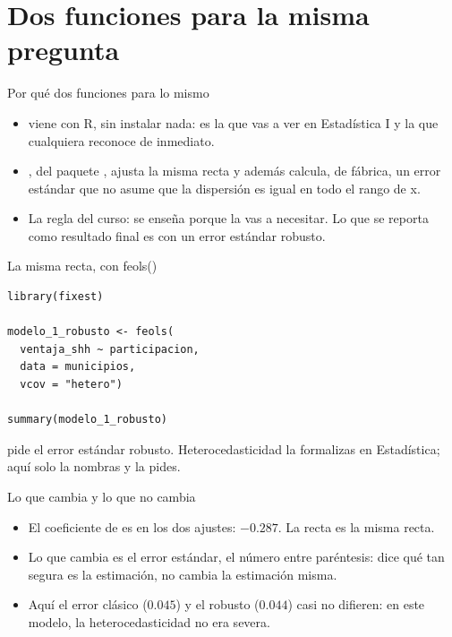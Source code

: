 \section{Dos funciones para la misma pregunta}

\begin{frame}{Por qué dos funciones para lo mismo}
  \vspace{0.3em}
  \begin{itemize}\setlength{\itemsep}{0.9em}
    \item<1->  viene con R, sin instalar nada: es la que vas a ver
          en Estadística I y la que cualquiera reconoce de inmediato.
    \item<2-> , del paquete , ajusta la misma
          recta y además calcula, de fábrica, un error estándar que no
          asume que la dispersión es igual en todo el rango de x.
    \item<3-> La regla del curso:  se enseña porque la vas a
          necesitar. Lo que se \ac{reporta} como resultado final es
           con un error estándar robusto.
  \end{itemize}
\end{frame}

\begin{frame}[fragile]{La misma recta, con feols()}
\begin{lstlisting}
library(fixest)

modelo_1_robusto <- feols(
  ventaja_shh ~ participacion,
  data = municipios,
  vcov = "hetero")

summary(modelo_1_robusto)
\end{lstlisting}

  \vspace{0.5em}
  {\small {} pide el error estándar robusto.
  \ac{Heterocedasticidad} la formalizas en Estadística; aquí solo la
  nombras y la pides.}
\end{frame}

\begin{frame}{Lo que cambia y lo que no cambia}
  \vspace{0.3em}
  \begin{itemize}\setlength{\itemsep}{0.9em}
    \item<1-> El coeficiente de  es  en los dos ajustes: $-0.287$. La recta es la misma recta.
    \item<2-> Lo que cambia es el error estándar, el número entre
          paréntesis: dice qué tan segura es la estimación, no cambia la
          estimación misma.
    \item<3-> Aquí el error clásico ($0.045$) y el robusto ($0.044$) casi no
          difieren: en este modelo, la heterocedasticidad no era severa.
  \end{itemize}
\end{frame}

